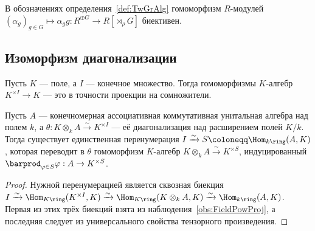 \documentclass[
	extrafontsizes,
	11pt,
	hyphens,
]{memoir}
\begin{document}
\begin{observation}
В обозначениях определения~\ref{def:TwGrAlg} гомоморфизм \(R\)-мо\-ду\-лей \((\alpha_g)_{g \in G} \mapsto \alpha_g g : R^{\oplus G} \to R[\rtimes_\rho G]\) биективен.
\end{observation}

\subsection{Изоморфизм диагонализации}

\begin{observation} \label{obs:FieldPowProj}
Пусть \(K\) --- поле, а \(I\) --- конечное множество.
Тогда
гомоморфизмы \(K\)-алгебр \(K^{\times I} \to K\)
--- это в точности проекции на сомножители.
\end{observation}

\begin{theorem} \label{thm:GalIsoOne}
Пусть \(A\) --- конечномерная ассоциативная коммутативная унитальная алгебра над полем \(k\),
а \(\theta : K \otimes_k A \xrightarrow{\sim} K^{\times I}\) --- её диагонализация над расширением полей \(K/k\).
Тогда существует единственная перенумерация \(I \xrightarrow{\sim} S \coloneqq \Hom_{k\ring}(A,K)\), которая переводит в \(\theta\) гомоморфизм
\(K\)-ал\-ге\-бр \(K \otimes_k A \xrightarrow{\sim} K^{\times S}\), индуцированный \(\barprod_{\varphi \in S} \varphi : A \to K^{\times S}\).
\end{theorem}

\begin{proof}
Нужной перенумерацией является сквозная биекция
\(
I \xrightarrow{\sim} \Hom_{K\ring}(K^{\times I}, K) \xrightarrow{\sim} \Hom_{K\ring}(K \otimes_k A, K) \xrightarrow{\sim} \Hom_{k\ring}(A,K)
\).
Первая из этих трёх биекций взята из наблюдения~\ref{obs:FieldPowProj}, а последняя следует из универсального свойства тензорного произведения.
\end{proof}

\end{document}
